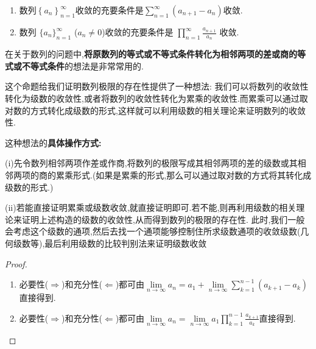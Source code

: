 \documentclass[lang=cn,newtx,10pt,scheme=chinese]{elegantbook}
\begin{document}
\begin{proposition}[数列收敛的级数与累乘形式]\label{proposition:数列收敛的级数与累乘形式}
\begin{enumerate}
\item 数列$\left\{ a_n \right\} _{n=1}^{\infty}$收敛的充要条件是$\sum\limits_{n=1}^{\infty}{\left( a_{n+1}-a_n \right)}$收敛.

\item 数列 \(\{ a_n \}_{n = 1}^{\infty}\) (\(a_n\neq 0\))收敛的充要条件是 \(\prod_{n = 1}^{\infty} \frac{a_{n + 1}}{a_n}\) 收敛.
\end{enumerate}
\end{proposition}
\begin{remark}
在关于数列的问题中,\textbf{将原数列的等式或不等式条件转化为相邻两项的差或商的等式或不等式条件}的想法是非常常用的.
\end{remark}
\begin{note}
这个命题给我们证明数列极限的存在性提供了一种想法:
我们可以将数列的收敛性转化为级数的收敛性,或者将数列的收敛性转化为累乘的收敛性.而累乘可以通过取对数的方式转化成级数的形式,这样就可以利用级数的相关理论来证明数列的收敛性.

这种想法的\textbf{具体操作方式:}

(i)先令数列相邻两项作差或作商,将数列的极限写成其相邻两项的差的级数或其相邻两项的商的累乘形式.(如果是累乘的形式,那么可以通过取对数的方式将其转化成级数的形式.)

(ii)若能直接证明累乘或级数收敛,就直接证明即可.若不能,则再利用级数的相关理论来证明上述构造的级数的收敛性,从而得到数列的极限的存在性.
此时,我们一般会考虑这个级数的通项,然后去找一个通项能够控制住所求级数通项的收敛级数(几何级数等),最后利用级数的比较判别法来证明级数收敛
\end{note}
\begin{proof}
\begin{enumerate}
\item 必要性($\Rightarrow$)和充分性($\Leftarrow$)都可由$\underset{n\rightarrow \infty}{\lim}a_n=a_1+\underset{n\rightarrow \infty}{\lim}\sum_{k=1}^{n-1}{\left( a_{k+1}-a_k \right)}$直接得到.

\item 必要性($\Rightarrow$)和充分性($\Leftarrow$)都可由$\underset{n\rightarrow \infty}{\lim}a_n=\underset{n\rightarrow \infty}{\lim}a_1\prod_{k=1}^{n-1}{\frac{a_{k+1}}{a_k}}$直接得到.
\end{enumerate}
\end{proof}
\end{document}

